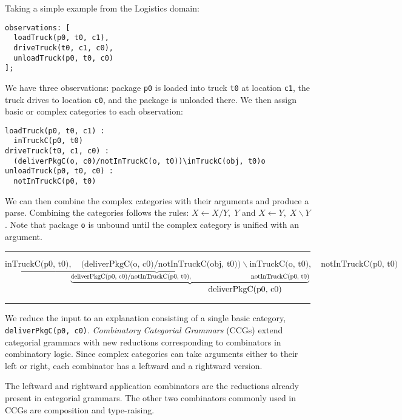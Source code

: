 Taking a simple example from the Logistics domain:

\begin{lstlisting}
observations: [
  loadTruck(p0, t0, c1),
  driveTruck(t0, c1, c0),
  unloadTruck(p0, t0, c0)
];
\end{lstlisting}

We have three observations: package \texttt{p0} is loaded into truck \texttt{t0} at location \texttt{c1}, the truck drives to location \texttt{c0}, and the package is unloaded there. We then assign basic or complex categories to each observation:

\begin{lstlisting}
loadTruck(p0, t0, c1) :
  inTruckC(p0, t0)
driveTruck(t0, c1, c0) :
  (deliverPkgC(o, c0)/notInTruckC(o, t0))\inTruckC(obj, t0)o
unloadTruck(p0, t0, c0) :
  notInTruckC(p0, t0)
\end{lstlisting}


We can then combine the complex categories with their arguments and produce a parse. Combining the categories follows the rules: $ X\leftarrow X/Y,\; Y$ and $ X\leftarrow Y,\; X\backslash Y$. Note that package \texttt{o} is unbound until the complex category is unified with an argument.

\noindent\rule{\textwidth}{0.4pt}
{\ttfamily\scriptsize
$\underbrace{\text{inTruckC(p0, t0)},\quad \text{(deliverPkgC(o, c0)}/\text{notInTruckC(obj, t0))}\backslash{}\text{inTruckC(o, t0)}},\quad \text{notInTruckC(p0, t0)}$\\
$\hspace*{10em}\underbrace{\text{deliverPkgC(p0, c0)}/\text{notInTruckC(p0, t0)},\hspace*{9em}\text{notInTruckC(p0, t0)}}$\\
$\hspace*{24em} \text{deliverPkgC(p0, c0)}$
}\\
\noindent\rule{\textwidth}{0.4pt}

We reduce the input to an explanation consisting of a single basic category, \texttt{deliverPkgC(p0, c0)}.
\emph{Combinatory Categorial Grammars} (CCGs) extend categorial grammars with new reductions corresponding to combinators in combinatory logic. Since complex categories can take arguments either to their left or right, each combinator has a leftward and a rightward version.

The leftward and rightward application combinators are the reductions already present in categorial grammars. The other two combinators commonly used in CCGs are composition and type-raising.

